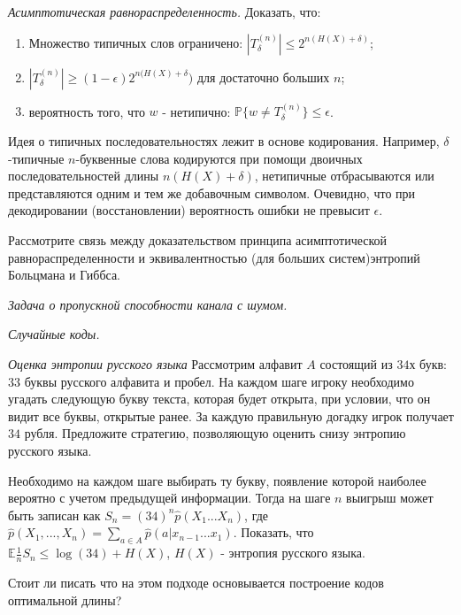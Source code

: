 \begin{problem} \textit{Асимптотическая равнораспределенность.}
Доказать, что:
\begin{enumerate}
\item Множество типичных слов ограничено: $|T_{\delta}^{(n)}| \leq 2^{n(H(X) + \delta)}$;
\item $|T_{\delta}^{(n)}| \geq (1-\epsilon)2^{n(H(X) + \delta})$ для достаточно больших $n$;
\item вероятность того, что $w$ - нетипично: $\mathbb{P}\{w \neq T_{\delta}^{(n)} \} \leq \epsilon$.
\end{enumerate}
\end{problem}

\begin{remark} Идея о типичных последовательностях лежит в основе кодирования. Например, $\delta$-типичные $n$-буквенные слова кодируются при помощи двоичных последовательностей длины $n(H(X) + \delta)$, нетипичные отбрасываются или представляются одним и тем же добавочным символом. Очевидно, что при декодировании (восстановлении) вероятность ошибки не превысит $\epsilon$.
\end{remark}

\begin{problem} Рассмотрите связь между доказательством принципа асимптотической равнораспределенности и эквивалентностью (для больших систем)энтропий Больцмана и Гиббса.
\end{problem}

\begin{problem} \textit{Задача о пропускной способности канала с шумом.}
\end{problem}

\begin{problem} \textit{Случайные коды.}
\end{problem}

\begin{problem} \textit{Оценка энтропии русского языка}
Рассмотрим алфавит $A$ состоящий из $34$х букв: $33$ буквы русского алфавита и пробел. На каждом шаге игроку необходимо угадать следующую букву текста, которая будет открыта, при условии, что он видит все буквы, открытые ранее. За каждую правильную догадку игрок получает $34$ рубля. Предложите стратегию, позволяющую оценить снизу энтропию русского языка.
\begin{ordre} Необходимо на каждом шаге выбирать ту букву, появление которой наиболее вероятно с учетом предыдущей информации. Тогда на шаге $n$ выигрыш может быть записан как $S_n = (34)^n \hat{p}(X_1...X_n)$, где $\hat{p}(X_1,...,X_n) = \sum_{a \in A} \hat{p}(a|x_{n-1}...x_1)$. Показать, что $\mathbb{E}\frac{1}{n}S_n \leq \log(34) + H(X)$, $H(X)$ - энтропия русского языка.
\end{ordre}   
\end{problem}
\begin{remark} Стоит ли писать что на этом подходе основывается построение кодов оптимальной длины?
\end{remark}

